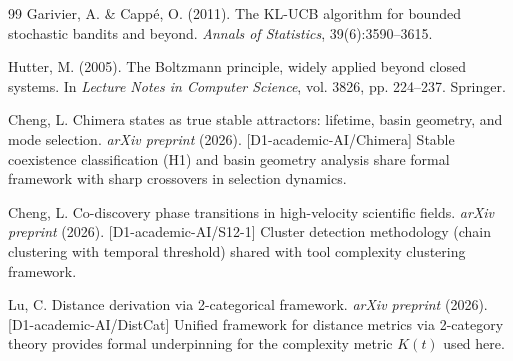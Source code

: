 \documentclass[12pt]{article}
\theoremstyle{definition}
\begin{document}
\begin{thebibliography}{99}
Garivier, A. \& Capp{\'e}, O. (2011).
\newblock The KL-UCB algorithm for bounded stochastic bandits and beyond.
\newblock \emph{Annals of Statistics}, 39(6):3590--3615.

Hutter, M. (2005).
\newblock The Boltzmann principle, widely applied beyond closed systems.
\newblock In \emph{Lecture Notes in Computer Science}, vol. 3826, pp. 224--237. Springer.

Cheng, L. Chimera states as true stable attractors: lifetime, basin geometry, and mode selection.
\textit{arXiv preprint} (2026). [D1-academic-AI/Chimera]
\newblock Stable coexistence classification (H1) and basin geometry analysis share formal framework with sharp crossovers in selection dynamics.

Cheng, L. Co-discovery phase transitions in high-velocity scientific fields.
\textit{arXiv preprint} (2026). [D1-academic-AI/S12-1]
\newblock Cluster detection methodology (chain clustering with temporal threshold) shared with tool complexity clustering framework.

Lu, C. Distance derivation via 2-categorical framework.
\textit{arXiv preprint} (2026). [D1-academic-AI/DistCat]
\newblock Unified framework for distance metrics via 2-category theory provides formal underpinning for the complexity metric $K(t)$ used here.

\end{thebibliography}
\end{document}
